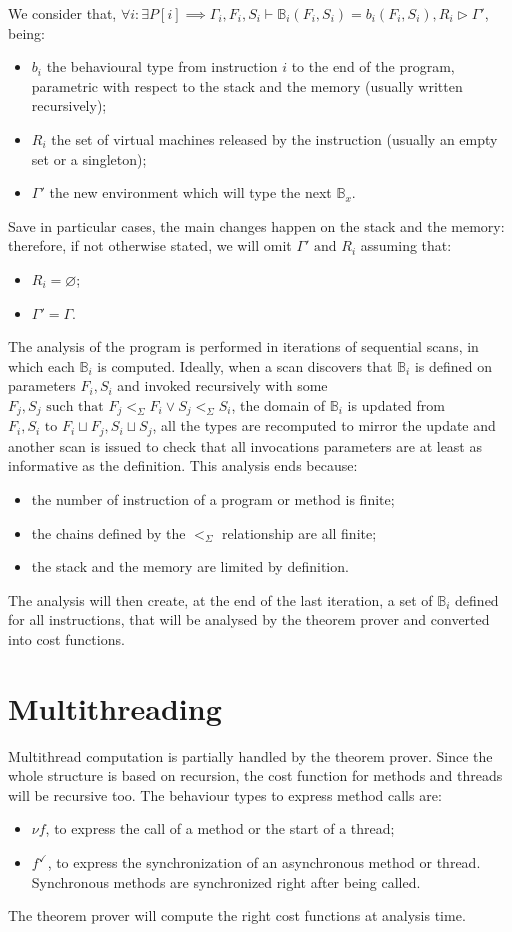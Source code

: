 \documentclass{amsart}
\newcommand{\bB}[1]{\mathbb{B}_{#1}}
\newcommand{\less}{<_\Sigma}
\renewcommand{\emptyset}{\varnothing}
\numberwithin{equation}{section}
\theoremstyle{plain} %
\theoremstyle{definition}
\theoremstyle{remark}
\begin{document}
We consider that, $\forall i: \exists P[i] \implies \Gamma_i, F_i, S_i \vdash \bB{i}(F_i, S_i) = b_i(F_i, S_i), R_i \rhd \Gamma'$, being:
\begin{itemize}
\item $b_i$ the behavioural type from instruction $i$ to the end of the program, parametric with respect to the stack and the memory (usually written recursively);
\item $R_i$ the set of virtual machines released by the instruction (usually an empty set or a singleton);
\item $\Gamma'$ the new environment which will type the next $\bB{x}$.
\end{itemize}
Save in particular cases, the main changes happen on the stack and the memory: therefore, if not otherwise stated, we will omit $\Gamma' \text{ and } R_i$ assuming that:
\begin{itemize}
\item $R_i = \emptyset$;
\item $\Gamma' = \Gamma$.
\end{itemize}

The analysis of the program is performed in iterations of sequential scans, in which each $\bB{i}$ is computed. Ideally, when a scan discovers that $\bB{i}$ is defined on parameters $F_i, S_i$ and invoked recursively with some $F_j, S_j \text{ such that } F_j \less{} F_i \vee S_j \less{} S_i$, the domain of $\bB{i}$ is updated from $F_i, S_i \text{ to } F_i \sqcup F_j, S_i \sqcup S_j$, all the types are recomputed to mirror the update and another scan is issued to check that all invocations parameters are at least as informative as the definition. This analysis ends because:
\begin{itemize}
\item the number of instruction of a program or method is finite;
\item the chains defined by the $\less$ relationship are all finite;
\item the stack and the memory are limited by definition.
\end{itemize}

The analysis will then create, at the end of the last iteration, a set of $\bB{i}$ defined for all instructions, that will be analysed by the theorem prover and converted into cost functions.

\section{Multithreading}
Multithread computation is partially handled by the theorem prover. Since the whole structure is based on recursion, the cost function for methods and threads will be recursive too. The behaviour types to express method calls are:
\begin{itemize}
\item $\nu f$, to express the call of a method or the start of a thread;
\item $f^\checkmark$, to express the synchronization of an asynchronous method or thread. Synchronous methods are synchronized right after being called.
\end{itemize}
The theorem prover will compute the right cost functions at analysis time.
\end{document}
